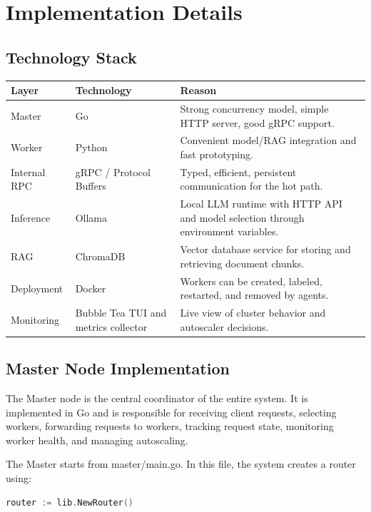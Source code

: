 \section{Implementation Details}

\subsection{Technology Stack}
\begin{table}[H]
  \centering
  \renewcommand{\arraystretch}{1.2}
  \begin{tabularx}{\textwidth}{@{}l l X@{}}
    \toprule
    \textbf{Layer} & \textbf{Technology} & \textbf{Reason} \\
    \midrule
    Master & Go & Strong concurrency model, simple HTTP server, good gRPC support. \\
    Worker & Python & Convenient model/RAG integration and fast prototyping. \\
    Internal RPC & gRPC / Protocol Buffers & Typed, efficient, persistent communication for the hot path. \\
    Inference & Ollama & Local LLM runtime with HTTP API and model selection through environment variables. \\
    RAG & ChromaDB & Vector database service for storing and retrieving document chunks. \\
    Deployment & Docker & Workers can be created, labeled, restarted, and removed by agents. \\
    Monitoring & Bubble Tea TUI and metrics collector & Live view of cluster behavior and autoscaler decisions. \\
    \bottomrule
  \end{tabularx}
\end{table}

\subsection{Master Node Implementation}
The Master node is the central coordinator of the entire system. It is implemented in Go and is responsible for receiving client requests, selecting workers, forwarding requests to workers, tracking request state, monitoring worker health, and managing autoscaling.

The Master starts from master/main.go. In this file, the system creates a router using:

\begin{lstlisting}[language=Go]
router := lib.NewRouter()
\end{lstlisting}

